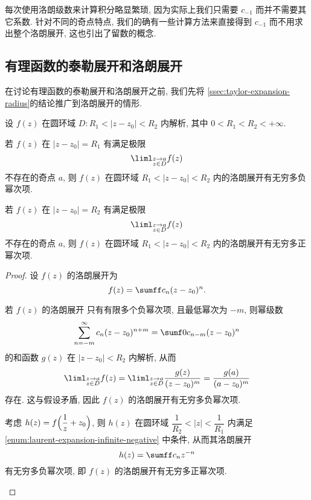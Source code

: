 每次使用洛朗级数来计算积分略显繁琐, 因为实际上我们只需要 $c_{-1}$ 而并不需要其它系数.
针对不同的奇点特点, 我们的确有一些计算方法来直接得到 $c_{-1}$ 而不用求出整个洛朗展开, 这也引出了留数的概念.


\subsection{有理函数的泰勒展开和洛朗展开\optional}
\label{ssec:rational-function-expansion}

在讨论有理函数的泰勒展开和洛朗展开之前, 我们先将 \ref{ssec:taylor-expansion-radius}的结论推广到洛朗展开的情形.

\begin{theorem}
  设 $f(z)$ 在圆环域 $D:R_1<|z-z_0|<R_2$ 内解析, 其中 $0<R_1<R_2<+\infty$.
  \begin{enuma}
    \item 若 $f(z)$ 在 $|z-z_0|=R_1$ 有满足极限
    \[
      \liml_{\substack{z\ra a\\ z\in D}} f(z)
    \]
    不存在的奇点 $a$, 则 $f(z)$ 在圆环域 $R_1<|z-z_0|<R_2$ 内的洛朗展开有无穷多负幂次项.
    \label{enum:laurent-expansion-infinite-negative}
    \item 若 $f(z)$ 在 $|z-z_0|=R_2$ 有满足极限
    \[
      \liml_{\substack{z\ra a\\z\in D}} f(z)
    \]
    不存在的奇点 $a$, 则 $f(z)$ 在圆环域 $R_1<|z-z_0|<R_2$ 内的洛朗展开有无穷多正幂次项.
  \end{enuma}
\end{theorem}

\begin{proof}
  设 $f(z)$ 的洛朗展开为
  \[
    f(z)=\sumff c_n(z-z_0)^n.
  \]
  \begin{enuma}
    \item 若 $f(z)$ 的洛朗展开
    只有有限多个负幂次项, 且最低幂次为 $-m$, 则幂级数
    \[
        \sum_{n=-m}^\infty c_n(z-z_0)^{n+m}
      =\sumf0 c_{n-m}(z-z_0)^n
    \]
    的和函数 $g(z)$ 在 $|z-z_0|<R_2$ 内解析, 从而
    \[
      \liml_{\substack{z\ra a\\z\in D}} f(z)
      =\liml_{\substack{z\ra a\\z\in D}} \frac{g(z)}{(z-z_0)^m}
      =\frac{g(a)}{(a-z_0)^m}
    \]
    存在.
    这与假设矛盾, 因此 $f(z)$ 的洛朗展开有无穷多负幂次项.
    \item 考虑 $h(z)=f\Bigl(\dfrac1z+z_0\Bigr)$, 则 $h(z)$ 在圆环域 $\dfrac 1{R_2}<|z|<\dfrac 1{R_1}$ 内满足 \ref{enum:laurent-expansion-infinite-negative} 中条件, 从而其洛朗展开
    \[
      h(z)=\sumff c_nz^{-n}
    \]
    有无穷多负幂次项, 即 $f(z)$ 的洛朗展开有无穷多正幂次项.
    \qedhere
  \end{enuma}
\end{proof}

